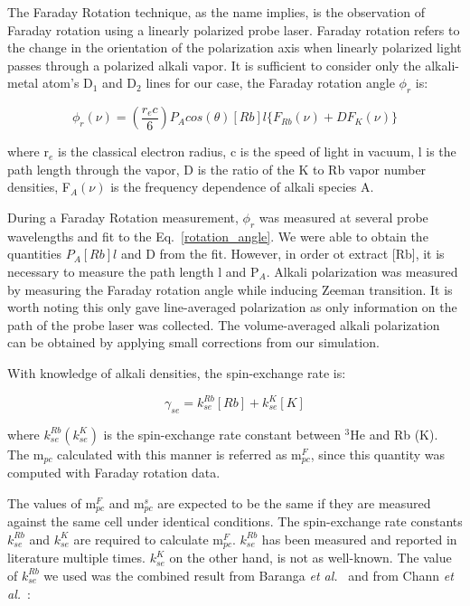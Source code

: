 The Faraday Rotation technique, as the name implies, is the observation of Faraday rotation using a linearly polarized probe laser. Faraday rotation refers to the change in the orientation of the polarization axis when linearly polarized light passes through a polarized alkali vapor. It is sufficient to consider only the alkali-metal atom's D$_{1}$ and D$_{2}$ lines for our case, the Faraday rotation angle $\phi_{r}$ is:

\begin{equation}\label{rotation_angle}
\phi_{r}(\nu)=\left(\frac{r_{e}c}{6}\right)P_{A}cos(\theta)[Rb]l\{F_{Rb}(\nu)+DF_{K}(\nu)\}
\end{equation}

where r$_{e}$ is the classical electron radius, c is the speed of light in vacuum, l is the path length through the vapor, D is the ratio of the K to Rb vapor number densities, F$_{A}(\nu)$ is the frequency dependence of alkali species A. 

During a Faraday Rotation measurement, $\phi_{r}$ was measured at several probe wavelengths and fit to the Eq.~\ref{rotation_angle}. We were able to obtain the quantities $P_{A}[Rb]l$ and D from the fit. However, in order ot extract [Rb], it is necessary to measure the path length l and P$_{A}$. Alkali polarization was measured by measuring the Faraday rotation angle while inducing Zeeman transition. It is worth noting this only gave line-averaged polarization as only information on the path of the probe laser was collected. The volume-averaged alkali polarization can be obtained by applying small corrections from our simulation.

With knowledge of alkali densities, the spin-exchange rate is:

\begin{equation}\label{gammasefr}
\gamma_{se}=k_{se}^{Rb}[Rb]+k_{se}^{K}[K]
\end{equation}

where $k_{se}^{Rb}(k_{se}^{K})$ is the spin-exchange rate constant between $^{3}$He and Rb (K). The m$_{pc}$ calculated with this manner is referred as m$_{pc}^{F}$, since this quantity was computed with Faraday rotation data.

The values of m$_{pc}^{F}$ and m$_{pc}^{s}$ are expected to be the same if they are measured against the same cell under identical conditions. The spin-exchange rate constants $k_{se}^{Rb}$ and $k_{se}^{K}$ are required to calculate m$_{pc}^{F}$. $k_{se}^{Rb}$ has been measured and reported in literature multiple times. $k_{se}^{K}$ on the other hand, is not as well-known. The value of $k_{se}^{Rb}$ we used was the combined result from Baranga \emph{et al.}~\cite{PhysRevLett.80.2801} and from Chann \emph{et al.}~\cite{PhysRevA.66.032703}:

